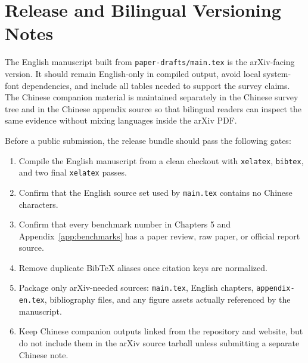 \section{Release and Bilingual Versioning Notes}
\label{app:release-notes}

The English manuscript built from \texttt{paper-drafts/main.tex} is the arXiv-facing version. It should remain English-only in compiled output, avoid local system-font dependencies, and include all tables needed to support the survey claims. The Chinese companion material is maintained separately in the Chinese survey tree and in the Chinese appendix source so that bilingual readers can inspect the same evidence without mixing languages inside the arXiv PDF.

Before a public submission, the release bundle should pass the following gates:

\begin{enumerate}
\item Compile the English manuscript from a clean checkout with \texttt{xelatex}, \texttt{bibtex}, and two final \texttt{xelatex} passes.
\item Confirm that the English source set used by \texttt{main.tex} contains no Chinese characters.
\item Confirm that every benchmark number in Chapters 5 and Appendix~\ref{app:benchmarks} has a paper review, raw paper, or official report source.
\item Remove duplicate BibTeX aliases once citation keys are normalized.
\item Package only arXiv-needed sources: \texttt{main.tex}, English chapters, \texttt{appendix-en.tex}, bibliography files, and any figure assets actually referenced by the manuscript.
\item Keep Chinese companion outputs linked from the repository and website, but do not include them in the arXiv source tarball unless submitting a separate Chinese note.
\end{enumerate}
